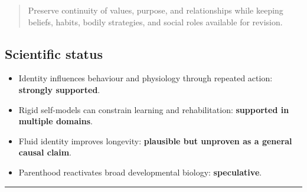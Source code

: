 \begin{quote}
Preserve continuity of values, purpose, and relationships while keeping beliefs, habits, bodily strategies, and social roles available for revision.
\end{quote}

\subsection{Scientific status}

\begin{itemize}
\tightlist
\item
  Identity influences behaviour and physiology through repeated action: \textbf{strongly supported}.
\item
  Rigid self-models can constrain learning and rehabilitation: \textbf{supported in multiple domains}.
\item
  Fluid identity improves longevity: \textbf{plausible but unproven as a general causal claim}.
\item
  Parenthood reactivates broad developmental biology: \textbf{speculative}.
\end{itemize}

\begin{center}\rule{0.5\linewidth}{0.5pt}\end{center}

